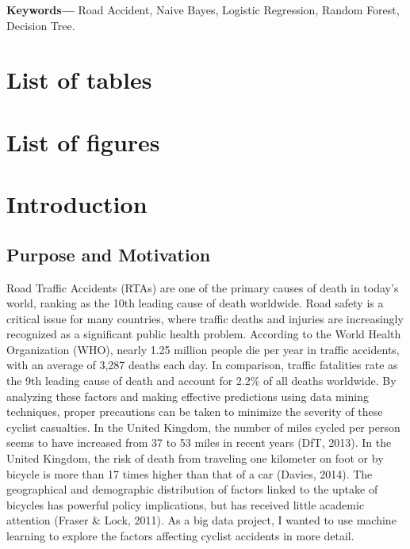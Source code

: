 \documentclass[
  a4paper,
]{article}
\begin{document}
\textbf{Keywords--- } Road Accident, Naive Bayes, Logistic Regression,
Random Forest, Decision Tree.

\newpage

\tableofcontents

\newpage

\hypertarget{list-of-tables}{%
\section*{List of tables}\label{list-of-tables}}

\renewcommand{\listtablename}{}
\listoftables

\newpage

\hypertarget{list-of-figures}{%
\section*{List of figures}\label{list-of-figures}}

\renewcommand{\listfigurename}{}
\listoffigures

\newpage


\hypertarget{intro}{%
\section{Introduction}\label{intro}}

\hypertarget{purpose-and-motivation}{%
\subsection{Purpose and Motivation}\label{purpose-and-motivation}}

Road Traffic Accidents (RTAs) are one of the primary causes of death in
today's world, ranking as the 10th leading cause of death worldwide.
Road safety is a critical issue for many countries, where traffic deaths
and injuries are increasingly recognized as a significant public health
problem. According to the World Health Organization (WHO), nearly 1.25
million people die per year in traffic accidents, with an average of
3,287 deaths each day. In comparison, traffic fatalities rate as the 9th
leading cause of death and account for 2.2\% of all deaths worldwide. By
analyzing these factors and making effective predictions using data
mining techniques, proper precautions can be taken to minimize the
severity of these cyclist casualties. In the United Kingdom, the number
of miles cycled per person seems to have increased from 37 to 53 miles
in recent years (DfT, 2013). In the United Kingdom, the risk of death
from traveling one kilometer on foot or by bicycle is more than 17 times
higher than that of a car (Davies, 2014). The geographical and
demographic distribution of factors linked to the uptake of bicycles has
powerful policy implications, but has received little academic attention
(Fraser \& Lock, 2011). As a big data project, I wanted to use machine
learning to explore the factors affecting cyclist accidents in more
detail.
\end{document}
